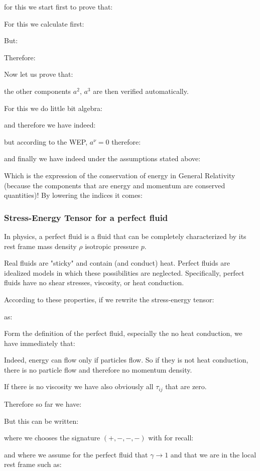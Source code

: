 	for this we start first to prove that:
	
	For this we calculate first:
	
	But:
	
	Therefore:
	
	Now let us prove that:
	
	the other components $a^2$, $a^3$ are then verified automatically.

	For this we do little bit algebra:
	
	and therefore we have indeed:
	
	but according to the WEP, $a^\nu=0$ therefore:
	
	and finally we have indeed under the assumptions stated above:
	
	Which is the expression of the conservation of energy in General Relativity (because the components that are energy and momentum are conserved quantities)! By lowering the indices it comes:
	
	
	\subsubsection{Stress-Energy Tensor for a perfect fluid}
	In physics, a perfect fluid is a fluid that can be completely characterized by its rest frame mass density $\rho$ isotropic pressure $p$.
	
	Real fluids are "sticky" and contain (and conduct) heat. Perfect fluids are idealized models in which these possibilities are neglected. Specifically, perfect fluids have no shear stresses, viscosity, or heat conduction.
	
	According to these properties, if we rewrite the stress-energy tensor:
	
	as:
	
	Form the definition of the perfect fluid, especially the no heat conduction, we have immediately that:
	
	Indeed, energy can flow only if particles flow. So if they is not heat conduction, there is no particle flow and therefore no momentum density.
	
	If there is no viscosity we have also obviously all $\tau_{ij}$ that are zero.
	
	Therefore so far we have:
	
	But this can be written:
	
	where we chooses the signature $(+, -, -, -)$ with for recall:
	
	and where we assume for the perfect fluid that $\gamma\rightarrow 1$ and that we are in the local rest frame such as:
	
